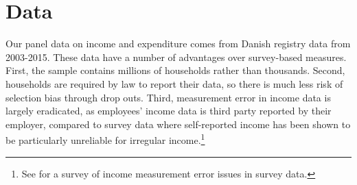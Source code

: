 \documentclass[titlepage]{\econtex}\newcommand{\texname}{ConsumptionHeterogeneity}
\begin{document}
\section{Data}
Our panel data on income and expenditure comes from Danish registry data from 2003-2015. These data have a number of advantages over survey-based measures. First, the sample contains millions of households rather than thousands. Second, households are required by law to report their data, so there is much less risk of selection bias through drop outs. Third, measurement error in income data is largely eradicated, as employees' income data is third party reported by their employer, compared to survey data where self-reported income has been shown to be particularly unreliable for irregular income.\footnote{See \cite{david_income_nodate} for a survey of income measurement error issues in survey data.}
\end{document}
